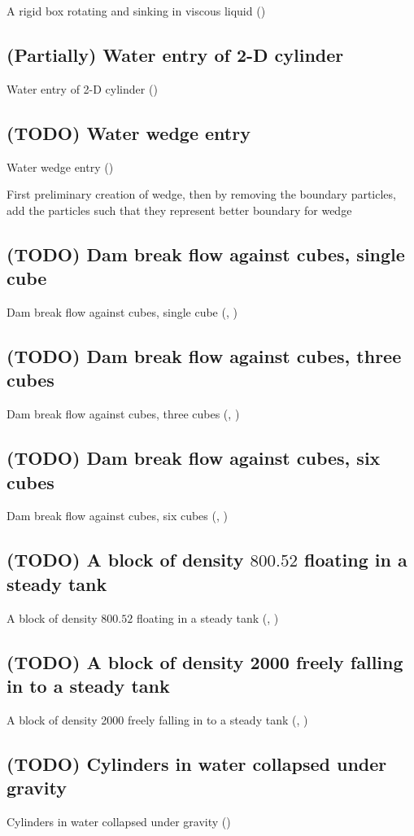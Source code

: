 \documentclass[preprint,12pt]{elsarticle}
\begin{document}
A rigid box rotating and sinking in viscous liquid
  (\citet{sun2015numerical})
%
\subsection{(Partially) Water entry of 2-D cylinder}

Water entry of 2-D cylinder (\citet{sun2015numerical})
%
\subsection{(TODO) Water wedge entry}
Water wedge entry (\citet{sun2015numerical})

First preliminary creation of wedge, then by removing the boundary particles,
add the particles such that they represent better boundary for wedge

%

\subsection{(TODO) Dam break flow against cubes, single cube}
Dam break flow against cubes, single cube (\citet{canelas2016sph},
  \citet{ji2019coupled})
%
\subsection{(TODO) Dam break flow against cubes, three cubes}
Dam break flow against cubes, three cubes (\citet{canelas2016sph},
  \citet{ji2019coupled})
%
\subsection{(TODO) Dam break flow against cubes, six cubes}
Dam break flow against cubes, six cubes (\citet{canelas2016sph},
  \citet{ji2019coupled})
%
\subsection{(TODO) A block of density $800.52$ floating in a steady tank}
A block of density $800.52$ floating in a steady tank
  (\citet{qiu20173d}, \citet{wang2019numerical})
%
\subsection{(TODO) A block of density 2000 freely falling in to a steady tank}
A block of density 2000 freely falling in to a steady tank
  (\citet{qiu20173d}, \citet{wang2019numerical})
%
\subsection{(TODO) Cylinders in water collapsed under gravity}
Cylinders in water collapsed under gravity (\citet{chen2019coupled})
%
\end{document}
